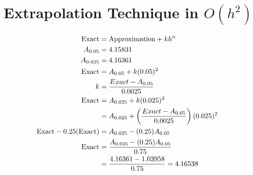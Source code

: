 \section{Extrapolation Technique in $O(h^{2})$}
	\begin{align}
		\text{Exact} &= \text{Approximation} + kh^{n}& \\
		A_{0.05} &= 4.15831& \\
		A_{0.025} &= 4.16361& \\
		\text{Exact} &= A_{0.05} + k(0.05)^{2}& \notag \\
		k &= \frac{Exact - A_{0.05}}{0.0025}& \\
		\text{Exact} &= A_{0.025} + k(0.025)^{2}& \notag \\
		&= A_{0.025} + \left(\frac{Exact - A_{0.05}}{0.0025}\right)(0.025)^{2}& \notag \\
		\text{Exact} - 0.25(\text{Exact}) &= A_{0.025} - (0.25)A_{0.05}& \notag \\
		\text{Exact} &= \frac{A_{0.025} - (0.25)A_{0.05}}{0.75}& \notag \\
		&= \frac{4.16361-1.03958}{0.75} = 4.16538&
	\end{align}
